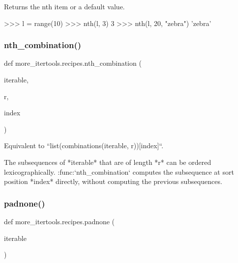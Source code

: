 \begin{DoxyVerb}Returns the nth item or a default value.

    >>> l = range(10)
    >>> nth(l, 3)
    3
    >>> nth(l, 20, "zebra")
    'zebra'\end{DoxyVerb}
 \mbox{\label{namespacemore__itertools_1_1recipes_a876c7c479546a7c16bfd39dde32ff354}} 
\subsubsection{\texorpdfstring{nth\+\_\+combination()}{nth\_combination()}}
{\footnotesize\ttfamily def more\+\_\+itertools.\+recipes.\+nth\+\_\+combination (\begin{DoxyParamCaption}\item[{}]{iterable,  }\item[{}]{r,  }\item[{}]{index }\end{DoxyParamCaption})}

\begin{DoxyVerb}Equivalent to ``list(combinations(iterable, r))[index]``.

The subsequences of *iterable* that are of length *r* can be ordered
lexicographically. :func:`nth_combination` computes the subsequence at
sort position *index* directly, without computing the previous
subsequences.\end{DoxyVerb}
 \mbox{\label{namespacemore__itertools_1_1recipes_ac5597d78009d99f7e689816d319a9a19}} 
\subsubsection{\texorpdfstring{padnone()}{padnone()}}
{\footnotesize\ttfamily def more\+\_\+itertools.\+recipes.\+padnone (\begin{DoxyParamCaption}\item[{}]{iterable }\end{DoxyParamCaption})}

